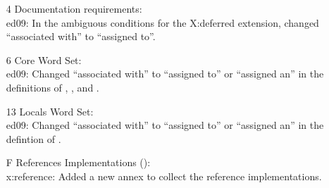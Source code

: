 


	\begin{itemize}
	\item[4] Documentation requirements: \\
		\textsf{ed09}: In the ambiguous conditions for the
			\textsf{X:deferred} extension, changed ``associated with''
			to ``assigned to''.

	\item[6] Core Word Set: \\
		\textsf{ed09}:
			Changed ``associated with'' to ``assigned to''
			or ``assigned an'' in the definitions of
			, ,
			 and .

	\item[13] Locals Word Set: \\
		\textsf{ed09}:
			Changed ``associated with'' to ``assigned to''
			or ``assigned an'' in the defintion of
			.

	\item[F] References Implementations (): \\
		\textsf{x:reference}:
			Added a new annex to collect the reference implementations.
	\end{itemize}


